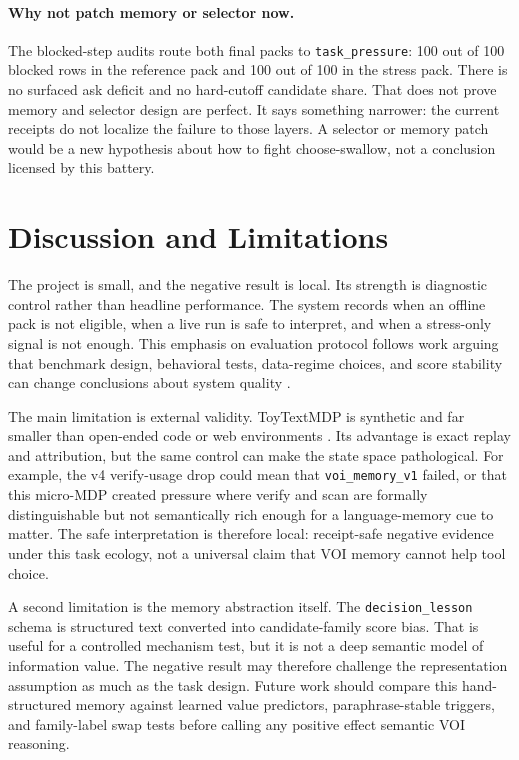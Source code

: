 \documentclass[11pt]{article}
\begin{document}
\paragraph{Why not patch memory or selector now.}
The blocked-step audits route both final packs to \texttt{task\_pressure}: 100 out of 100 blocked rows in the reference pack and 100 out of 100 in the stress pack. There is no surfaced ask deficit and no hard-cutoff candidate share. That does not prove memory and selector design are perfect. It says something narrower: the current receipts do not localize the failure to those layers. A selector or memory patch would be a new hypothesis about how to fight choose-swallow, not a conclusion licensed by this battery.

\section{Discussion and Limitations}

The project is small, and the negative result is local. Its strength is diagnostic control rather than headline performance. The system records when an offline pack is not eligible, when a live run is safe to interpret, and when a stress-only signal is not enough. This emphasis on evaluation protocol follows work arguing that benchmark design, behavioral tests, data-regime choices, and score stability can change conclusions about system quality \citep{ribeiro2020checklist,bowman2021benchmarking,warstadt2023babylm,liang2023helm,levtsov2025confidence}.

The main limitation is external validity. ToyTextMDP is synthetic and far smaller than open-ended code or web environments \citep{chen2021codeeval,jimenez2024swebench}. Its advantage is exact replay and attribution, but the same control can make the state space pathological. For example, the v4 verify-usage drop could mean that \texttt{voi\_memory\_v1} failed, or that this micro-MDP created pressure where verify and scan are formally distinguishable but not semantically rich enough for a language-memory cue to matter. The safe interpretation is therefore local: receipt-safe negative evidence under this task ecology, not a universal claim that VOI memory cannot help tool choice.

A second limitation is the memory abstraction itself. The \texttt{decision\_lesson} schema is structured text converted into candidate-family score bias. That is useful for a controlled mechanism test, but it is not a deep semantic model of information value. The negative result may therefore challenge the representation assumption as much as the task design. Future work should compare this hand-structured memory against learned value predictors, paraphrase-stable triggers, and family-label swap tests before calling any positive effect semantic VOI reasoning.
\end{document}
